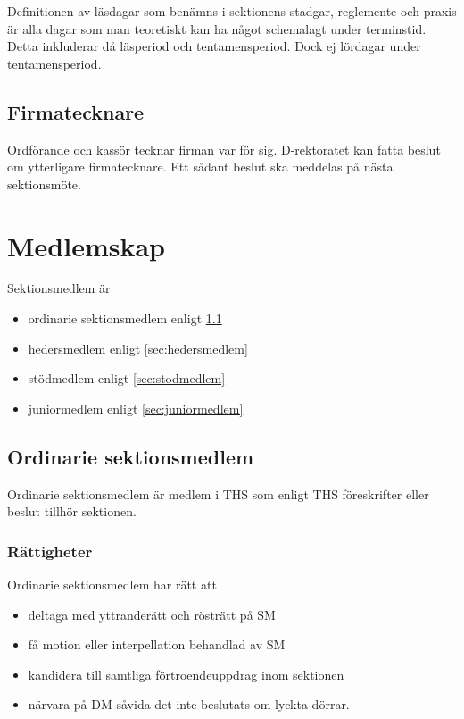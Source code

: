 \documentclass[a4paper,12pt]{article}
\begin{document}
Definitionen av läsdagar som benämns i sektionens stadgar, reglemente och praxis är alla dagar som man teoretiskt kan ha något schemalagt under terminstid. Detta inkluderar då läsperiod och tentamensperiod. Dock ej lördagar under tentamensperiod.

\subsection{Firmatecknare}

Ordförande och kassör tecknar firman var för sig. D-rektoratet kan fatta beslut om ytterligare firmatecknare. Ett sådant beslut ska meddelas på nästa sektionsmöte.

\section{Medlemskap}

Sektionsmedlem är

\begin{itemize}
  \item ordinarie sektionsmedlem enligt \ref{sec:ordinarie_sektionsmedlem}
  \item hedersmedlem enligt \ref{sec:hedersmedlem}
  \item stödmedlem enligt \ref{sec:stodmedlem}
  \item juniormedlem enligt \ref{sec:juniormedlem}
\end{itemize}

\subsection{Ordinarie sektionsmedlem}
\label{sec:ordinarie_sektionsmedlem}

Ordinarie sektionsmedlem är medlem i THS som enligt THS föreskrifter eller beslut tillhör sektionen.

\subsubsection{Rättigheter}

Ordinarie sektionsmedlem har rätt att

\begin{itemize}
  \item deltaga med yttranderätt och rösträtt på SM
  \item få motion eller interpellation behandlad av SM
  \item kandidera till samtliga förtroendeuppdrag inom sektionen
  \item närvara på DM såvida det inte beslutats om lyckta dörrar.
\end{itemize}
\end{document}
